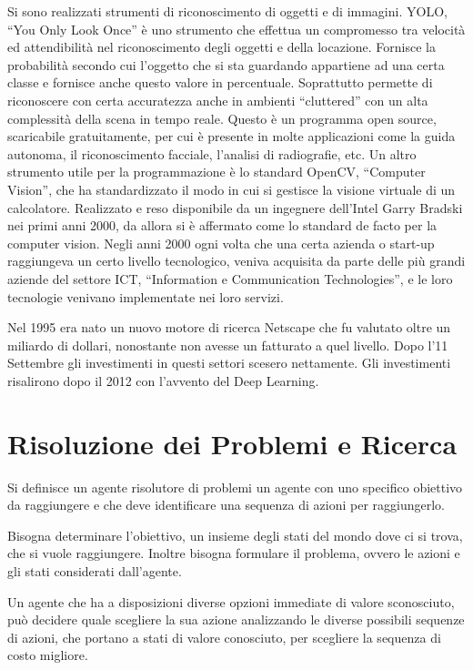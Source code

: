 \documentclass{article}
\numberwithin{equation}{subsection}
\begin{document}
Si sono realizzati strumenti di riconoscimento di oggetti e di immagini. YOLO, ``You Only Look Once'' è uno strumento che effettua un compromesso tra velocità 
ed attendibilità nel riconoscimento degli oggetti e della locazione. Fornisce la probabilità secondo cui l'oggetto che si sta guardando appartiene ad una certa classe 
e fornisce anche questo valore in percentuale. Soprattutto permette di riconoscere con certa accuratezza anche in ambienti ``cluttered'' con un alta 
complessità della scena in tempo reale. Questo è un programma open source, scaricabile gratuitamente, per cui è presente in molte applicazioni come la guida autonoma, il riconoscimento facciale, l'analisi di radiografie, etc. 
Un altro strumento utile per la programmazione è lo standard OpenCV, ``Computer Vision'', 
che ha standardizzato il modo in cui si gestisce la visione virtuale di un calcolatore. Realizzato e reso disponibile da un ingegnere dell'Intel Garry Bradski nei primi anni 2000, da allora si è affermato come lo standard de facto per la computer vision. 
Negli anni 2000 ogni volta che una certa azienda o start-up raggiungeva un certo livello tecnologico, veniva 
acquisita da parte delle più grandi aziende del settore ICT, ``Information e Communication Technologies'', e le loro tecnologie venivano 
implementate nei loro servizi. 

Nel 1995 era nato un nuovo motore di ricerca Netscape che fu valutato oltre un miliardo di dollari, nonostante non avesse un fatturato a quel livello. Dopo l'11 Settembre gli investimenti in questi settori scesero nettamente. Gli investimenti risalirono dopo il 2012 
con l'avvento del Deep Learning. 


\clearpage

\section{Risoluzione dei Problemi e Ricerca}

Si definisce un agente risolutore di problemi un agente con uno specifico obiettivo da 
raggiungere e che deve identificare una sequenza di azioni per raggiungerlo. 

Bisogna determinare l'obiettivo, un insieme degli stati del mondo dove ci si trova, che 
si vuole raggiungere. 
Inoltre bisogna formulare il problema, ovvero le azioni e gli stati considerati 
dall'agente. 


Un agente che ha a disposizioni diverse opzioni immediate di valore sconosciuto, può decidere 
quale scegliere la sua azione analizzando le diverse possibili sequenze di azioni, che portano 
a stati di valore conosciuto, per scegliere la sequenza di costo migliore. 
\end{document}
